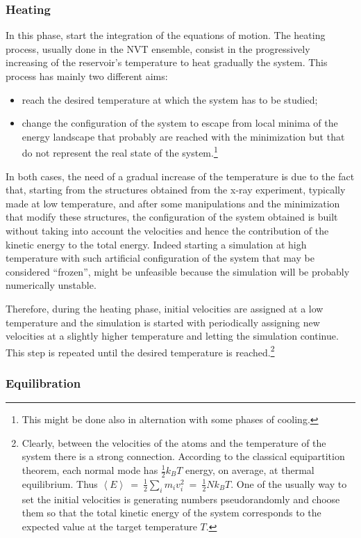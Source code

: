 \subsubsection{Heating}
In this phase, start the integration of the equations of motion.
The heating process, usually done in the NVT ensemble, consist in the progressively increasing of  the reservoir's temperature to heat gradually the system. This process has mainly two different aims: 
\begin{itemize}
\item reach the desired temperature at which the system has to be studied;
\item change the configuration of the system to escape from local minima of the energy landscape that probably are reached with the minimization but that do not represent the real state of the system.\footnote{This might be done also in alternation with some phases of cooling.}
\end{itemize}
In both cases, the need of a gradual increase of the temperature is due to the fact that, starting from the structures obtained from the x-ray experiment, typically made at low temperature, and after some manipulations and the minimization that modify these structures, the configuration of the system obtained is built without taking into account the velocities and hence the contribution of the kinetic energy to the total energy. Indeed starting a simulation at high temperature with such artificial configuration of the system that may be considered ``frozen'', might be unfeasible because the simulation will be probably numerically unstable.

Therefore, during the heating phase, initial velocities are assigned at a low temperature and the simulation is started with periodically assigning new velocities at a slightly higher temperature and letting the simulation continue. This step is repeated until the desired temperature is reached.\footnote{Clearly, between the velocities of the atoms and the temperature of the system there is a strong connection. According to the classical equipartition theorem, each normal mode has $\frac{1}{2} k_B T$ energy, on average, at thermal equilibrium. Thus $\left< E \right> \:=\: \frac{1}{2}\sum_i m_i v_i^2 \:=\: \frac{1}{2} N k_B T$.
One of the usually way to set the initial velocities is generating numbers pseudorandomly and choose them so that the total kinetic energy of the system corresponds to the expected value at the target temperature $T$.} 


\subsubsection{Equilibration}


